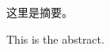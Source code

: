 \begin{cabstract}

这里是摘要。

\end{cabstract}

\begin{eabstract}

This is the abstract.

\end{eabstract}


